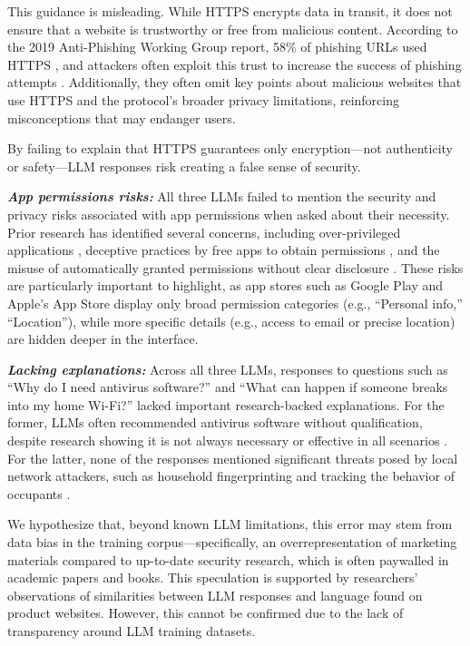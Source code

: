     This guidance is misleading. While HTTPS encrypts data in transit, it does not ensure that a website is trustworthy or free from malicious content. According to the 2019 Anti-Phishing Working Group report, 58\% of phishing URLs used HTTPS \cite{apwg2019-HTTPS-phishing-report}, and attackers often exploit this trust to increase the success of phishing attempts \cite{kim-https-phishing-CA-2021}. Additionally, they often omit key points about malicious websites that use HTTPS and the protocol’s broader privacy limitations, reinforcing misconceptions that may endanger users.
    
    By failing to explain that HTTPS guarantees only encryption—not authenticity or safety—LLM responses risk creating a false sense of security. 

    \noindent \textit{\textbf{App permissions risks:}} All three LLMs failed to mention the security and privacy risks associated with app permissions when asked about their necessity. Prior research has identified several concerns, including over-privileged applications \cite{felt-permissions-2011}, deceptive practices by free apps to obtain permissions \cite{chia-permission-risks-2012}, and the misuse of automatically granted permissions without clear disclosure \cite{calciati-auto-permissions-2020}. These risks are particularly important to highlight, as app stores such as Google Play and Apple’s App Store display only broad permission categories (e.g., “Personal info,” “Location”), while more specific details (e.g., access to email or precise location) are hidden deeper in the interface.

    \noindent \textit{\textbf{Lacking explanations:}} Across all three LLMs, responses to questions such as “Why do I need antivirus software?” and “What can happen if someone breaks into my home Wi-Fi?” lacked important research-backed explanations. For the former, LLMs often recommended antivirus software without qualification, despite research showing it is not always necessary or effective in all scenarios \cite{dekoven-security-practices-2019}. For the latter, none of the responses mentioned significant threats posed by local network attackers, such as household fingerprinting and tracking the behavior of occupants \cite{girish-local-iot-2023}.
     

    We hypothesize that, beyond known LLM limitations, this error may stem from data bias in the training corpus—specifically, an overrepresentation of marketing materials compared to up-to-date security research, which is often paywalled in academic papers and books. This speculation is supported by researchers' observations of similarities between LLM responses and language found on product websites. However, this cannot be confirmed due to the lack of transparency around LLM training datasets.

